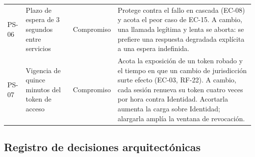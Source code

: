 \documentclass[11pt,a4paper]{article}
\begin{document}
\begin{longtable}{L{1.2cm} L{3.6cm} L{2.0cm} L{7.4cm}}
PS-06 & Plazo de espera de 3 segundos entre servicios & Compromiso & Protege contra el fallo en cascada (EC-08) y acota el peor caso de EC-15. A cambio, una llamada legítima y lenta se aborta: se prefiere una respuesta degradada explícita a una espera indefinida. \\
PS-07 & Vigencia de quince minutos del token de acceso & Compromiso & Acota la exposición de un token robado y el tiempo en que un cambio de jurisdicción surte efecto (EC-03, RF-22). A cambio, cada sesión renueva su token cuatro veces por hora contra Identidad. Acortarla aumenta la carga sobre Identidad; alargarla amplía la ventana de revocación. \\
\end{longtable}

\subsection{Registro de decisiones arquitectónicas}
\end{document}

